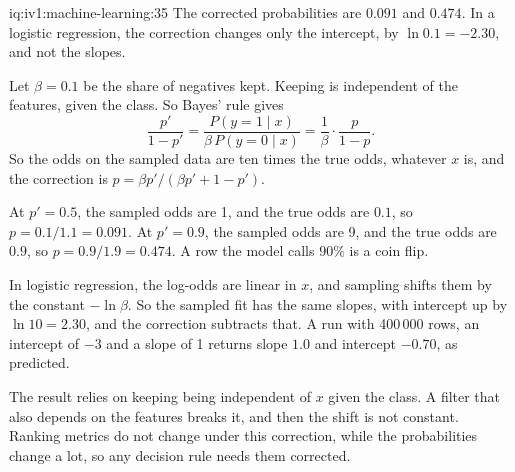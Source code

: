 \begin{solution}{iq:iv1:machine-learning:35}
The corrected probabilities are $0.091$ and $0.474$. In a logistic regression, the correction changes only the intercept, by $\ln 0.1 = -2.30$, and not the slopes.

Let $\beta = 0.1$ be the share of negatives kept. Keeping is independent of the features, given the class. So Bayes' rule gives
\[
\frac{p'}{1 - p'} = \frac{P(y = 1 \mid x)}{\beta\,P(y = 0 \mid x)} = \frac{1}{\beta}\cdot\frac{p}{1 - p}.
\]
So the odds on the sampled data are ten times the true odds, whatever $x$ is, and the correction is $p = \beta p'/(\beta p' + 1 - p')$.

At $p' = 0.5$, the sampled odds are 1, and the true odds are $0.1$, so $p = 0.1/1.1 = 0.091$. At $p' = 0.9$, the sampled odds are 9, and the true odds are $0.9$, so $p = 0.9/1.9 = 0.474$. A row the model calls $90\%$ is a coin flip.

In logistic regression, the log-odds are linear in $x$, and sampling shifts them by the constant $-\ln\beta$. So the sampled fit has the same slopes, with intercept up by $\ln 10 = 2.30$, and the correction subtracts that. A run with 400\,000 rows, an intercept of $-3$ and a slope of 1 returns slope $1.0$ and intercept $-0.70$, as predicted.

The result relies on keeping being independent of $x$ given the class. A filter that also depends on the features breaks it, and then the shift is not constant. Ranking metrics do not change under this correction, while the probabilities change a lot, so any decision rule needs them corrected.



\end{solution}


